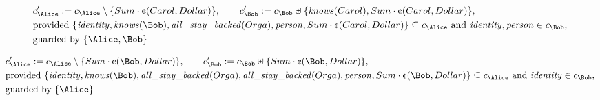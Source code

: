 \begin{align*}
&
c'_
{
\Alice
}
 := 
c_
{
\Alice
}
 \setminus 
\{
Sum
\cdot
\text{\textcent}
(
Carol
,
Dollar
)
\}
, \qquad 
c'_
{
\Bob
}
 := 
c_
{
\Bob
}
 \uplus 
\{
\mathit{\detokenize{
knows
}}
(
Carol
)
,
Sum
\cdot
\text{\textcent}
(
Carol
,
Dollar
)
\}
,\\
&
\text{provided } 
\{
\mathit{\detokenize{
identity
}}
,
\mathit{\detokenize{
knows
}}
(
\Bob
)
,
\mathit{\detokenize{
all_stay_backed
}}
(
Orga
)
,
\mathit{\detokenize{
person
}}
,
Sum
\cdot
\text{\textcent}
(
Carol
,
Dollar
)
\}
 \subseteq c_
{
\Alice
}
 \text{ and } 
\mathit{\detokenize{
identity
}}
,
\mathit{\detokenize{
person
}}
 \in c_
{
\Bob
}
,\\
&
\text{guarded by } \{
\Alice
,
\Bob
\}
\end{align*}

\begin{align*}
&
c'_
{
\Alice
}
 := 
c_
{
\Alice
}
 \setminus 
\{
Sum
\cdot
\text{\textcent}
(
\Bob
,
Dollar
)
\}
, \qquad 
c'_
{
\Bob
}
 := 
c_
{
\Bob
}
 \uplus 
\{
Sum
\cdot
\text{\textcent}
(
\Bob
,
Dollar
)
\}
,\\
&
\text{provided } 
\{
\mathit{\detokenize{
identity
}}
,
\mathit{\detokenize{
knows
}}
(
\Bob
)
,
\mathit{\detokenize{
all_stay_backed
}}
(
Orga
)
,
\mathit{\detokenize{
all_stay_backed
}}
(
Orga
)
,
\mathit{\detokenize{
person
}}
,
Sum
\cdot
\text{\textcent}
(
\Bob
,
Dollar
)
\}
 \subseteq c_
{
\Alice
}
 \text{ and } 
\mathit{\detokenize{
identity
}}
 \in c_
{
\Bob
}
,\\
&
\text{guarded by } \{
\Alice
\}
\end{align*}

